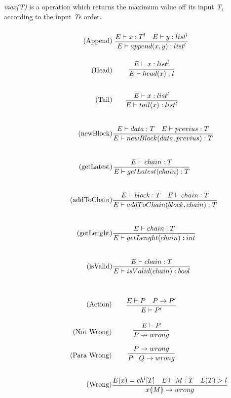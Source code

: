 \textit{max(T)} is a operation which returns the maximum value off its input \textit{T}, according to the input \textit{T}s order.
\begin{align}
\tag{Append} &\infrule{E \vdash x:T^l \quad E \vdash y:list^l}{E \vdash append(x,y):list^l}\\
\tag{Head} &\infrule{E \vdash x:list^l}{E \vdash head(x):l}\\
\tag{Tail} &\infrule{E \vdash x:list^l}{E \vdash tail(x):list^l}\\
\tag{newBlock}& \infrule{E \vdash data:T \quad E \vdash previus : T}{E \vdash newBlock(data, previus) :T}\\
\tag{getLatest}& \infrule{E \vdash chain :T}{E \vdash getLatest(chain):T}\\
\tag{addToChain}& \infrule{E \vdash block:T \quad E \vdash chain:T}{E \vdash addToChain(block, chain):T}\\
\tag{getLenght}& \infrule{E \vdash chain:T}{E \vdash getLenght(chain):int}\\
\tag{isValid}& \infrule{E \vdash chain:T}{E \vdash isValid(chain):bool}
\end{align}

\begin{align}
\tag{Action} & \infrule{E \vdash P \quad P\ra P'}{E\vdash P'}\\
\tag{Not Wrong}& \infrule{E \vdash P}{P \nrightarrow wrong}\\
\tag{Para Wrong}& \infrule{P \ra wrong}{P\para Q \ra wrong}\\
\tag{Wrong}& \infrule{E(x) = ch^l[T] \quad E \vdash M:T \quad L(T) > l }{\lift{x}{M} \ra wrong}\\
\end{align}


%
%

\FloatBarrier
